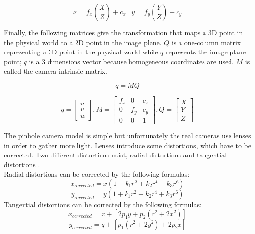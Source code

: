 \begin{equation}
  x = f_x\left(\frac{X}{Z}\right) + c_x \,\,\,\,\, y = f_y\left(\frac{Y}{Z}\right) + c_y    
\end{equation}

Finally, the following matrices \cite[p. 374]{bradski_learning_2008} give the transformation that maps a 3D point in the physical world to a 2D point in the image plane. $Q$ is a one-column matrix representing a 3D point in the physical world while $q$ represents the image plane point; $q$ is a 3 dimensions vector because homogeneous coordinates are used. $M$ is called the camera intrinsic matrix.

\begin{equation}\label{eq:q=MQ}
  q = MQ     
\end{equation}

\begin{equation}\label{eq:q=MQMatrice}
  q = \begin{bmatrix}
       u \\
       v \\
       w 
     \end{bmatrix}, 
  M = \begin{bmatrix}
       f_x & 0 & c_x \\
       0 & f_y & c_y \\
       0 & 0 & 1
     \end{bmatrix}, 
  Q = \begin{bmatrix}
       X \\
       Y \\
       Z 
     \end{bmatrix}     
\end{equation}

The pinhole camera model is simple but unfortunately the real cameras use lenses in order to gather more light. Lenses introduce some distortions, which have to be corrected. Two different distortions exist, radial distortions and tangential distortions \cite[p. 375]{bradski_learning_2008}. \\

Radial distortions can be corrected by the following formulas:
\begin{equation}
  x_{corrected} = x(1 + k_1r^2 + k_2r^4 + k_3r^6)    
\end{equation}
\begin{equation}
  y_{corrected} = y(1 + k_1r^2 + k_2r^4 + k_3r^6)    
\end{equation}
Tangential distortions can be corrected by the following formulas: 
\begin{equation}
  x_{corrected} = x + [2p_1y + p_2(r^2 + 2x^2)]    
\end{equation}
\begin{equation}
  y_{corrected} = y + [p_1(r^2 + 2y^2) + 2p_2x]
\end{equation}

